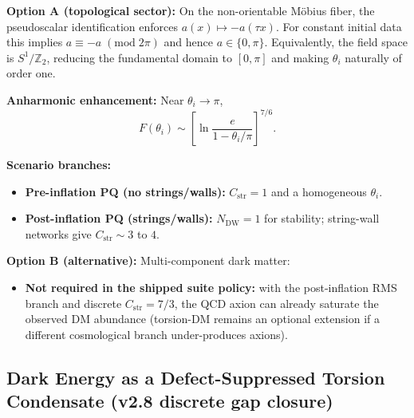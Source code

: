 \begin{tcolorbox}[colback=yellow!5, colframe=yellow!60!black, 
    title={\textbf{Resolution: Topologically Preferred $\theta_i$}}, fonttitle=\bfseries\small]
\textbf{Option A (topological sector):} On the non-orientable M\"obius fiber, the pseudoscalar
identification enforces $a(x)\mapsto -a(\tau x)$. For constant initial data this implies
$a \equiv -a \;(\mathrm{mod}\;2\pi)$ and hence $a \in \{0,\pi\}$. Equivalently, the field space
is $S^1/\mathbb{Z}_2$, reducing the fundamental domain to $[0,\pi]$ and making $\theta_i$
naturally of order one.

\textbf{Anharmonic enhancement:} Near $\theta_i \to \pi$,
\begin{equation}
    F(\theta_i) \sim \left[\ln\frac{e}{1 - \theta_i/\pi}\right]^{7/6}.
\end{equation}

\textbf{Scenario branches:}
\begin{itemize}[leftmargin=1.5em, topsep=2pt, itemsep=1pt]
    \item \textbf{Pre-inflation PQ (no strings/walls):} $C_{\mathrm{str}}=1$ and a homogeneous $\theta_i$.
    \item \textbf{Post-inflation PQ (strings/walls):} $N_{\mathrm{DW}}=1$ for stability; string-wall networks give $C_{\mathrm{str}}\sim 3$ to $4$.
\end{itemize}

\textbf{Option B (alternative):} Multi-component dark matter:
\begin{itemize}[leftmargin=1.5em, topsep=2pt, itemsep=1pt]
    \item \textbf{Not required in the shipped suite policy:} with the post-inflation RMS branch and discrete $C_{\mathrm{str}}=7/3$, the QCD axion can already saturate the observed DM abundance (torsion-DM remains an optional extension if a different cosmological branch under-produces axions).
\end{itemize}
\end{tcolorbox}

\subsection{Dark Energy as a Defect-Suppressed Torsion Condensate (v2.8 discrete gap closure)}
\label{sec:dark-energy}

